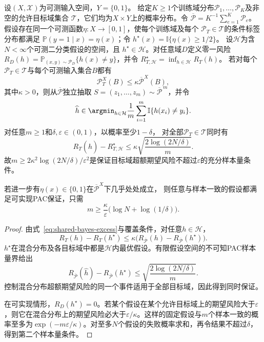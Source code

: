 \begin{theorem}[共享标签机制下的领域泛化]
\label{thm:dg-shared-pac}
设$(X,\mathcal X)$为可测输入空间，$Y=\{0,1\}$。
给定$K\geq1$个训练域分布$\mathcal P_1,\ldots,\mathcal P_K$及非空的允许目标域集合
$\mathcal T$，它们均为$X\times Y$上的概率分布。令
$\overline{\mathcal P}=K^{-1}\sum_{e=1}^K\mathcal P_e$。
假设存在同一个可测函数$\eta:X\to[0,1]$，使每个训练域及每个
$\mathcal P_T\in\mathcal T$的条件标签分布都满足
$\mathbb P(y=1\mid x)=\eta(x)$；令
$h^\star(x)=\mathbb I\{\eta(x)\geq1/2\}$。
设$\mathcal H$为含$N<\infty$个可测二分类假设的空间，且
$h^\star\in\mathcal H$。对任意域$D$定义零一风险
$R_D(h)=\mathbb P_{(x,y)\sim\mathcal P_D}\{h(x)\neq y\}$，并令
$R_{T,\mathcal H}^{\star}=\inf_{h\in\mathcal H}R_T(h)$。
若对每个$\mathcal P_T\in\mathcal T$与每个可测输入集合$B$都有
\[
 \mathcal P_T^X(B)\leq\kappa\overline{\mathcal P}^{X}(B),
\]
其中$\kappa>0$，则从$\overline{\mathcal P}$独立抽取
$S=(z_1,\ldots,z_m)\sim\overline{\mathcal P}^{\,m}$，并令
\[
 \widehat h\in\argmin_{h\in\mathcal H}
 \frac1m\sum_{i=1}^m\mathbb I\{h(x_i)\neq y_i\}.
\]
对任意$m\geq1$和$\delta,\varepsilon\in(0,1)$，以概率至少$1-\delta$，
对全部$\mathcal P_T\in\mathcal T$同时有
\begin{equation}
 R_T(\widehat h)-R_{T,\mathcal H}^{\star}
 \leq\kappa\sqrt{\frac{2\log(2N/\delta)}{m}}.
 \label{eq:dg-shared-pac}
\end{equation}
故$m\geq2\kappa^2\log(2N/\delta)/\varepsilon^2$是保证目标域超额期望风险不超过$\varepsilon$的充分样本量条件。

若进一步有$\eta(x)\in\{0,1\}$在$\overline{\mathcal P}^X$下几乎处处成立，
则任意与样本一致的假设都满足可实现PAC保证，只需
\[
 m\geq\frac{\kappa}{\varepsilon}
       \bigl(\log N+\log(1/\delta)\bigr).
\]
\end{theorem}
\begin{proof}
由式~\eqref{eq:shared-bayes-excess}与覆盖条件，对任意$h\in\mathcal H$，
\[
 R_T(h)-R_T(h^\star)
 \leq\kappa\bigl(R_{\overline{\mathcal P}}(h)
                  -R_{\overline{\mathcal P}}(h^\star)\bigr).
\]
$h^\star$在混合分布及各目标域中都是$\mathcal H$内最优假设。有限假设空间的不可知PAC样本量界给出
\[
 R_{\overline{\mathcal P}}(\widehat h)
 -R_{\overline{\mathcal P}}(h^\star)
 \leq\sqrt{\frac{2\log(2N/\delta)}{m}}.
\]
控制混合分布超额期望风险的同一个事件适用于全部目标域，因此得到同时保证。

在可实现情形，$R_D(h^\star)=0$。若某个假设在某个允许目标域上的期望风险大于$\varepsilon$，则它在混合分布上的期望风险必大于$\varepsilon/\kappa$。这样的固定假设与$m$个样本一致的概率至多为$\exp(-m\varepsilon/\kappa)$。对至多$N$个假设的失败概率求和，再令结果不超过$\delta$，得到第二个样本量条件。
\end{proof}

